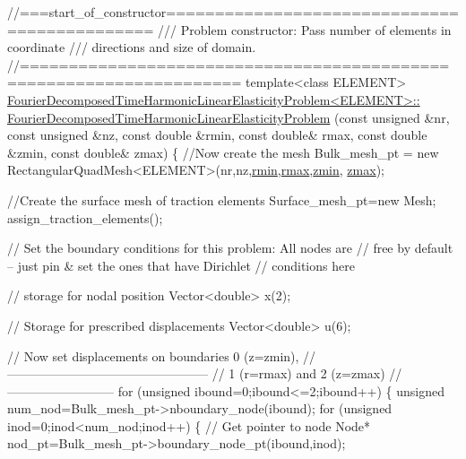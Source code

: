 \begin{DoxyCodeInclude}
\textcolor{comment}{//===start\_of\_constructor=============================================}
\textcolor{comment}{/// Problem constructor: Pass number of elements in coordinate}
\textcolor{comment}{}\textcolor{comment}{/// directions and size of domain.}
\textcolor{comment}{}\textcolor{comment}{//====================================================================}
\textcolor{keyword}{template}<\textcolor{keyword}{class} ELEMENT>
\hyperlink{classFourierDecomposedTimeHarmonicLinearElasticityProblem_a52597ec969cbd2aaa9fde263594c1c32}{FourierDecomposedTimeHarmonicLinearElasticityProblem<ELEMENT>::}
\hyperlink{classFourierDecomposedTimeHarmonicLinearElasticityProblem_a52597ec969cbd2aaa9fde263594c1c32}{FourierDecomposedTimeHarmonicLinearElasticityProblem}
(\textcolor{keyword}{const} \textcolor{keywordtype}{unsigned} &nr, \textcolor{keyword}{const} \textcolor{keywordtype}{unsigned} &nz,
 \textcolor{keyword}{const} \textcolor{keywordtype}{double} &rmin, \textcolor{keyword}{const} \textcolor{keywordtype}{double}& rmax,
 \textcolor{keyword}{const} \textcolor{keywordtype}{double} &zmin, \textcolor{keyword}{const} \textcolor{keywordtype}{double}& zmax)
\{
 \textcolor{comment}{//Now create the mesh}
 Bulk\_mesh\_pt = \textcolor{keyword}{new} RectangularQuadMesh<ELEMENT>(nr,nz,\hyperlink{namespaceGlobal__Parameters_ad454d80ae621f272dd1d7932249545a5}{rmin},\hyperlink{namespaceGlobal__Parameters_a5d7fb394c980bb4bf2a52158f9d7cc50}{rmax},\hyperlink{namespaceGlobal__Parameters_ac6a17dbcf1b8f1136a1ec5c07efef708}{zmin},
      \hyperlink{namespaceGlobal__Parameters_a8ee2afb91b9b105939f19a0efa8e1441}{zmax});

 \textcolor{comment}{//Create the surface mesh of traction elements}
 Surface\_mesh\_pt=\textcolor{keyword}{new} Mesh;
 assign\_traction\_elements();
 
 \textcolor{comment}{// Set the boundary conditions for this problem: All nodes are}
 \textcolor{comment}{// free by default -- just pin & set the ones that have Dirichlet }
 \textcolor{comment}{// conditions here}
 
 \textcolor{comment}{// storage for nodal position}
 Vector<double> x(2);

 \textcolor{comment}{// Storage for prescribed displacements}
 Vector<double> u(6);

 \textcolor{comment}{// Now set displacements on boundaries 0 (z=zmin),}
 \textcolor{comment}{//------------------------------------------------}
 \textcolor{comment}{// 1 (r=rmax) and 2 (z=zmax)}
 \textcolor{comment}{//--------------------------}
 \textcolor{keywordflow}{for} (\textcolor{keywordtype}{unsigned} ibound=0;ibound<=2;ibound++)
  \{
   \textcolor{keywordtype}{unsigned} num\_nod=Bulk\_mesh\_pt->nboundary\_node(ibound);
   \textcolor{keywordflow}{for} (\textcolor{keywordtype}{unsigned} inod=0;inod<num\_nod;inod++) 
    \{
     \textcolor{comment}{// Get pointer to node}
     Node* nod\_pt=Bulk\_mesh\_pt->boundary\_node\_pt(ibound,inod);
     

\end{DoxyCodeInclude}
